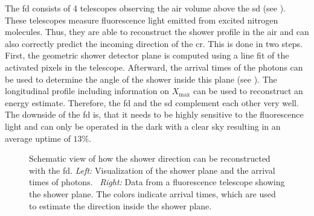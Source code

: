 The \gls{fd} consists of 4 telescopes observing the air volume above the \gls{sd} (see ). These telescopes measure fluorescence light emitted from excited nitrogen molecules. Thus, they are able to reconstruct the shower profile in the air and can also correctly predict the incoming direction of the \gls{cr}. This is done in two steps. First, the geometric shower detector plane is computed using a line fit of the activated pixels in the telescope. Afterward, the arrival times of the photons can be used to determine the angle of the shower inside this plane (see ). The longitudinal profile including information on \(X_{\max}\) can be used to reconstruct an energy estimate. Therefore, the \gls{fd} and the \gls{sd} complement each other very well. The downside of the \gls{fd} is, that it needs to be highly sensitive to the fluorescence light and can only be operated in the dark with a clear sky resulting in an average uptime of \(13\%{}\).
\begin{figure}[t!]
    \centering
    \begin{minipage}{0.4\textwidth}
    \end{minipage}\ind{}
    \begin{minipage}{0.5\textwidth}
    \end{minipage}
    \caption{Schematic view of how the shower direction can be reconstructed with the \gls{fd}. \emph{Left:} Visualization of the shower plane and the arrival times of photons.~\cite{Abraham2010} \emph{Right:} Data from a fluorescence telescope showing the shower plane. The colors indicate arrival times, which are used to estimate the direction inside the shower plane.~\cite{Kumpel2011}}\label{fig:auger-fd}
\end{figure}
